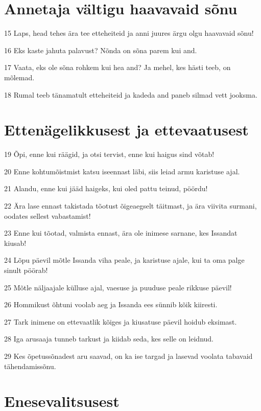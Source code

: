 \section*{Annetaja vältigu haavavaid sõnu}

\par 15 Laps, head tehes ära tee etteheiteid ja anni juures ärgu olgu haavavaid sõnu!
\par 16 Eks kaste jahuta palavust? Nõnda on sõna parem kui and.
\par 17 Vaata, eks ole sõna rohkem kui hea and? Ja mehel, kes hästi teeb, on mõlemad.
\par 18 Rumal teeb tänamatult etteheiteid ja kadeda and paneb silmad vett jooksma.

\section*{Ettenägelikkusest ja ettevaatusest}

\par 19 Õpi, enne kui räägid, ja otsi tervist, enne kui haigus sind võtab!
\par 20 Enne kohtumõistmist katsu iseennast läbi, siis leiad armu karistuse ajal.
\par 21 Alandu, enne kui jääd haigeks, kui oled pattu teinud, pöördu!
\par 22 Ära lase ennast takistada tõotust õigeaegselt täitmast, ja ära viivita surmani, oodates sellest vabastamist!
\par 23 Enne kui tõotad, valmista ennast, ära ole inimese sarnane, kes Issandat kiusab!
\par 24 Lõpu päevil mõtle Issanda viha peale, ja karistuse ajale, kui ta oma palge sinult pöörab!
\par 25 Mõtle näljaajale külluse ajal, vaesuse ja puuduse peale rikkuse päevil!
\par 26 Hommikust õhtuni voolab aeg ja Issanda ees sünnib kõik kiiresti.
\par 27 Tark inimene on ettevaatlik kõiges ja kiusatuse päevil hoidub eksimast.
\par 28 Iga arusaaja tunneb tarkust ja kiidab seda, kes selle on leidnud.
\par 29 Kes õpetussõnadest aru saavad, on ka ise targad ja lasevad voolata tabavaid tähendamissõnu.

\section*{Enesevalitsusest}

